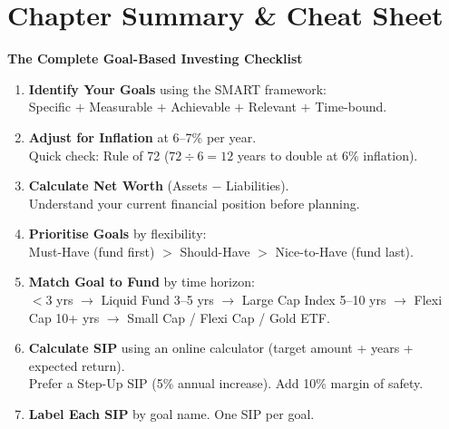 \documentclass[12pt,a4paper]{article}
\begin{document}
\section*{Chapter Summary \& Cheat Sheet}

\begin{cheatsheet}

\textbf{\color{PrimaryBlue}\large The Complete Goal-Based Investing Checklist}

\medskip
\begin{enumerate}[label=\textbf{Step \arabic*:}, leftmargin=*, align=left]

  \item \textbf{Identify Your Goals} using the SMART framework:\\
  Specific $+$ Measurable $+$ Achievable $+$ Relevant $+$ Time-bound.

  \item \textbf{Adjust for Inflation} at 6--7\% per year.\\
  Quick check: Rule of 72 ($72 \div 6 = 12$ years to double at 6\% inflation).

  \item \textbf{Calculate Net Worth} (Assets $-$ Liabilities).\\
  Understand your current financial position before planning.

  \item \textbf{Prioritise Goals} by flexibility:\\
  Must-Have (fund first) $>$ Should-Have $>$ Nice-to-Have (fund last).

  \item \textbf{Match Goal to Fund} by time horizon:\\
  $<$3 yrs $\to$ Liquid Fund \textbar{} 3--5 yrs $\to$ Large Cap Index \textbar{}
  5--10 yrs $\to$ Flexi Cap \textbar{} 10+ yrs $\to$ Small Cap / Flexi Cap / Gold ETF.

  \item \textbf{Calculate SIP} using an online calculator (target amount + years + expected return).\\
  Prefer a Step-Up SIP (5\% annual increase). Add 10\% margin of safety.

  \item \textbf{Label Each SIP} by goal name. One SIP per goal.


\end{enumerate}
\end{cheatsheet}
\end{document}
